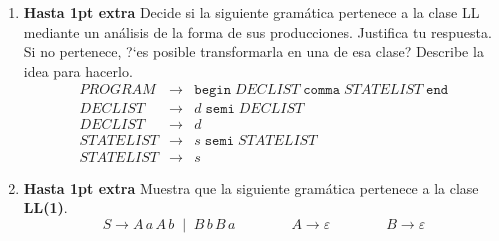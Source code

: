 \documentclass[11pt,letterpaper]{article}
\begin{document}
\begin{enumerate}
\newpage


\item  \textbf{Hasta 1pt extra} 
Decide  si la siguiente gram\'atica pertenece a la clase LL mediante 
un an\'alisis de la forma de sus producciones. Justifica tu respuesta.\\
 Si no pertenece, ?`es posible transformarla en una de esa clase? Describe la 
idea para hacerlo. 
\[
\begin{array}{rcl}
PROGRAM & \to & \texttt{begin}\; DECLIST\; \texttt{comma} \;STATELIST \;
\texttt{end}\\
DECLIST & \to & d\; \texttt{semi}\; DECLIST \\
DECLIST & \to & d \\
STATELIST & \to & s\; \texttt{semi}\; STATELIST \\
STATELIST &\to &s
\end{array}
\]

\item \textbf{Hasta 1pt extra} 
Muestra que la siguiente gram\'atica pertenece a la clase \textbf{LL(1)}.
\[
S \to A \, a\, A\,b \;\mid\; B\,b\,B\,a \qquad \qquad  A \to \varepsilon 
\qquad\qquad B\to \varepsilon
\]

\end{enumerate}
\end{document}
